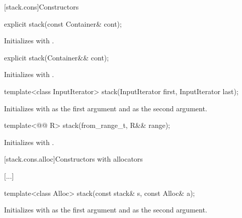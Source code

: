 \documentclass{wg21}
\begin{document}
[stack.cons]{Constructors}

\begin{itemdecl}
    explicit stack(const Container& cont);
\end{itemdecl}

\begin{itemdescr}
    \pnum
    \effects Initializes  with .
\end{itemdescr}

\begin{itemdecl}
    explicit stack(Container&& cont);
\end{itemdecl}

\begin{itemdescr}
    \pnum
    \effects Initializes  with .
\end{itemdescr}

\begin{itemdecl}
    template<class InputIterator>
    stack(InputIterator first, InputIterator last);
\end{itemdecl}

\begin{itemdescr}
    \pnum
    \effects
    Initializes  with  as the first argument and  as the second argument.
\end{itemdescr}

\begin{addedblock}
\begin{itemdecl}
template<@@ R>
stack(from_range_t, R&& range);
\end{itemdecl}

\begin{itemdescr}
\pnum
\effects
Initializes  with .
\end{itemdescr}
\end{addedblock}

[stack.cons.alloc]{Constructors with allocators}

[...]

%
\begin{itemdecl}
    template<class Alloc> stack(const stack& s, const Alloc& a);
\end{itemdecl}

\begin{itemdescr}
    \pnum
    \effects
    Initializes  with  as the first argument and 
    as the second argument.
\end{itemdescr}
\end{document}
